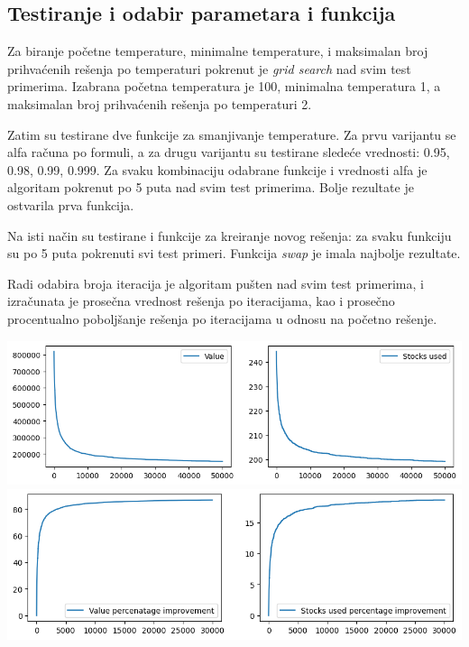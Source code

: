 \documentclass[12pt, a4paper]{article}
\begin{document}
\subsection{Testiranje i odabir parametara i funkcija}
Za biranje početne temperature, minimalne temperature, i maksimalan broj prihvaćenih rešenja po temperaturi pokrenut je \textit{grid search} nad svim test primerima. Izabrana početna temperatura je 100, minimalna temperatura 1, a maksimalan broj prihvaćenih rešenja po temperaturi 2.

Zatim su testirane dve funkcije za smanjivanje temperature. Za prvu varijantu se alfa računa po formuli, a za drugu varijantu su testirane sledeće vrednosti: 0.95, 0.98, 0.99, 0.999. Za svaku kombinaciju odabrane funkcije i vrednosti alfa je algoritam pokrenut po 5 puta nad svim test primerima. Bolje rezultate je ostvarila prva funkcija.

Na isti način su testirane i funkcije za kreiranje novog rešenja: za svaku funkciju su po 5 puta pokrenuti svi test primeri. Funkcija \textit{swap} je imala najbolje rezultate.

Radi odabira broja iteracija je algoritam pušten nad svim test primerima, i izračunata je prosečna vrednost rešenja po iteracijama, kao i prosečno procentualno poboljšanje rešenja po iteracijama u odnosu na početno rešenje.

\vspace{0.5cm}
\begin{center}
  \includegraphics[width=\linewidth]{img/sa_iters_avg.png}
  \includegraphics[width=\linewidth]{img/sa_iters_perc.png}
\end{center}
\vspace{0.5cm}
\end{document}
